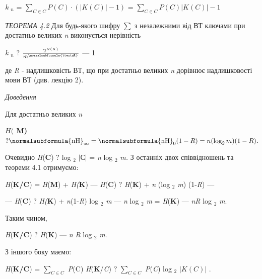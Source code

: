\bigskip

{\centering
\textit{k} ${}_n$ =   $\underset{C\in C}{\sum }{P(C)\cdot (|K(C)|-1)}$
=   $\underset{C\in C}{\sum }{P(C)|K(C)|-1}$
\par}


\bigskip

\textit{ТЕОРЕМА 4.2}\textit{  }Для будь-якого шифру   $\sum $ з незалежними
від ВТ ключами  при достатньо великих \textit{n} виконується  нерівність 

{\centering
\textit{k} ${}_n$   $?$  
$\frac{2^{H(K)}}{m^{\normalsubformula{\textnR}}}$ ---  1 
\par}


\bigskip

 де  \textit{R}  {}-  надлишковість  ВТ, що при достатньо великих \textit{n}
дорівнює надлишковості мови ВТ (див. лекцію 2).

{\itshape
Доведення }

 Для  достатньо великих  \textit{n} 

{\centering\bfseries
 $H($ M) ${?\normalsubformula{\text{nH}}_{{\infty
}}=\normalsubformula{\text{nH}}_{0}(1-R)=n(\log _{2}m)(1-R)\text{.}}$
\par}

Очевидно \textit{ }\textit{H}(\textbf{C})  $?$  log ${}_2$
$|\text{С}|$ =  \textit{n} log ${}_2$ \textit{m}\textit{.}  З останніх
двох співвідношень та теореми 4.1  отримуємо:

{\centering
\textit{H}(\textbf{K}\textbf{/}\textbf{C}) = \textit{H}(\textbf{M}) +
\textit{H}\textit{(}\textbf{K}) --- \textit{H}(\textbf{C})  $?$ 
\textit{H}(\textbf{K}) + \textit{n} (log ${}_2$ \textit{m})
(1-\textit{R}) ---
\par}

{\centering
--- \textit{H}(\textbf{C})  $?$ \textit{H}\textit{(}\textbf{K}) +
\textit{n}(1-\textit{R}) log ${}_2$ \textit{m} --- \textit{n} log
${}_2$ \textit{m} = \textit{H}(\textbf{K}) --- \textit{nR} log ${}_2$
\textit{m}.
\par}

Таким чином, 

{\centering
\textit{H}(\textbf{K}\textbf{/}\textbf{C}) $?$\textit{ }\textit{H}(\textbf{K})
--- \textit{n}\textit{ }\textit{R} log ${}_2$ \textit{m}.
\par}

З іншого боку маємо:

{\centering
\textit{H}(\textbf{K}\textbf{/}\textbf{C}) =   $\underset{C\in C}{\sum }$
\textit{P}(C) \textit{H}(\textbf{K}/\textit{C})  $?$  ${\underset{{C\in
C}}{\sum }{}}$ \textit{P}(\textit{C}) log ${}_2$ $|K(C)|$ .
\par}

